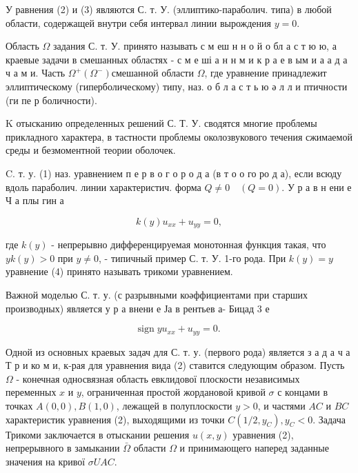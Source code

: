 \documentclass[10pt]{article}
\begin{document}
У равнения (2) и (3) являются С. т. У. (эллиптико-параболич. типа) в любой области, содержащей внутри себя интервал линии вырождения $y=0$.



Область $\Omega$ задания С. т. У. принято называть с м еш н н о й о бл а с т ю ю, а краевые задачи в смешанных областях - с м е ші а н н м и к р а е в ым и $а$ а д а ч а м и. Часть $\Omega^{+}\left(\Omega^{-}\right)$смешанной области $\Omega$, где уравнение принадлежит эллиптическому (гиперболическому) типу, наз. о б л а с т ь ю ә л л и птичности (ги пе р боличности).



K отысканию определенных решений С. Т. У. сводятся многие проблемы прикладного характера, в тастности проблемы околозвукового течения сжимаемой среды и безмоментной теории оболочек.



C. т. у. (1) наз. уравнением п е р в о г о р о д а (в т о о го ро д а), если всюду вдоль параболич. линии характеристич. форма $Q \neq 0 \quad(Q=0)$. У р а в н ени е Ч а плы гин а



\[

k(y) u_{x x}+u_{y y}=0,

\]



где $k(y)$ - непрерывно дифференцируемая монотонная функция такая, что $y k(y)>0$ при $y \neq 0$, - типичный пример С. т. У. 1-го рода. При $k(y)=y$ уравнение (4) принято называть трикоми уравнением.



Важной моделью С. т. у. (с разрывными коәффициентами при старших производных) является у р а внени е Ја в рентьев а- Бицад 3 е



\[

\operatorname{sign} y u_{x x}+u_{y y}=0 \text {. }

\]



Одной из основных краевых задач для С. т. у. (первого рода) является з а д а ч а Т р и ко м и, к-рая для уравнения вида (2) ставится следующим образом. Пусть $\Omega$ - конечная односвязная область евклидової плоскости независимых переменных $x$ и $y$, ограниченная простой жордановой кривой $\sigma$ с концами в точках $A(0,0), B(1,0)$, лежащей в полуплоскости $y>0$, и частями $A C$ и $B C$ характеристик уравнения (2), выходящими из точки $C\left(1 / 2, y_{C}\right), y_{C}<0$. Задача Трикоми заключается в отыскании решения $u(x, y)$ уравнения (2), непрерывного в замыкании $\bar{\Omega}$ области $\Omega$ и принимающего наперед заданные значения на кривої $\sigma U A C$.
\end{document}
